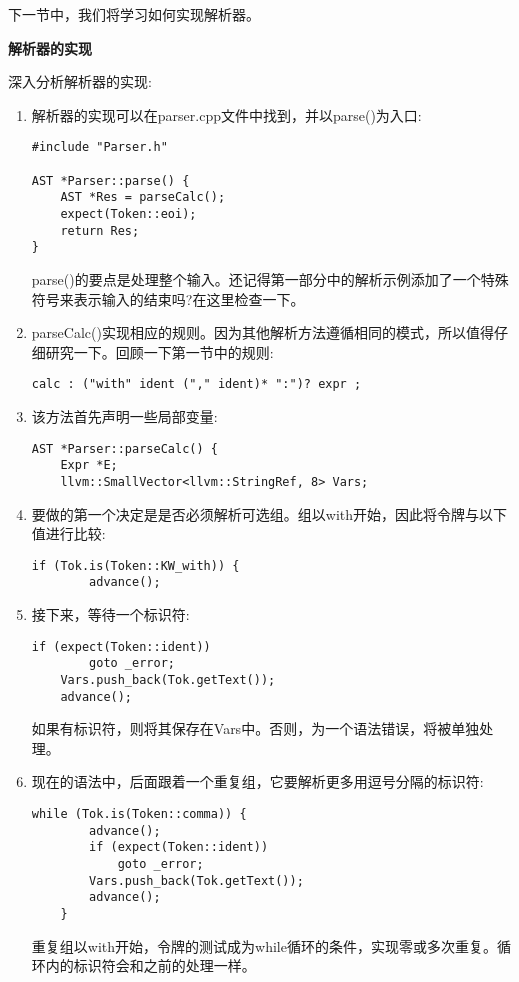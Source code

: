 下一节中，我们将学习如何实现解析器。\par

\hspace*{\fill} \par %
\textbf{解析器的实现}

深入分析解析器的实现:\par

\begin{enumerate}
\item 解析器的实现可以在parser.cpp文件中找到，并以parse()为入口:
\begin{lstlisting}[caption={}]
#include "Parser.h"

AST *Parser::parse() {
	AST *Res = parseCalc();
	expect(Token::eoi);
	return Res;
}
\end{lstlisting}
parse()的要点是处理整个输入。还记得第一部分中的解析示例添加了一个特殊符号来表示输入的结束吗?在这里检查一下。

\item parseCalc()实现相应的规则。因为其他解析方法遵循相同的模式，所以值得仔细研究一下。回顾一下第一节中的规则:
\begin{lstlisting}[caption={}]
calc : ("with" ident ("," ident)* ":")? expr ;
\end{lstlisting}

\item 该方法首先声明一些局部变量:
\begin{lstlisting}[caption={}]
AST *Parser::parseCalc() {
	Expr *E;
	llvm::SmallVector<llvm::StringRef, 8> Vars;
\end{lstlisting}

\item 要做的第一个决定是是否必须解析可选组。组以with开始，因此将令牌与以下值进行比较:
\begin{lstlisting}[caption={}]
	if (Tok.is(Token::KW_with)) {
		advance();
\end{lstlisting}

\item 接下来，等待一个标识符:
\begin{lstlisting}[caption={}]
	if (expect(Token::ident))
		goto _error;
	Vars.push_back(Tok.getText());
	advance();
\end{lstlisting}
如果有标识符，则将其保存在Vars中。否则，为一个语法错误，将被单独处理。

\item 现在的语法中，后面跟着一个重复组，它要解析更多用逗号分隔的标识符:
\begin{lstlisting}[caption={}]
	while (Tok.is(Token::comma)) {
		advance();
		if (expect(Token::ident))
			goto _error;
		Vars.push_back(Tok.getText());
		advance();
	}
\end{lstlisting}
重复组以with开始，令牌的测试成为while循环的条件，实现零或多次重复。循环内的标识符会和之前的处理一样。


\end{enumerate}

